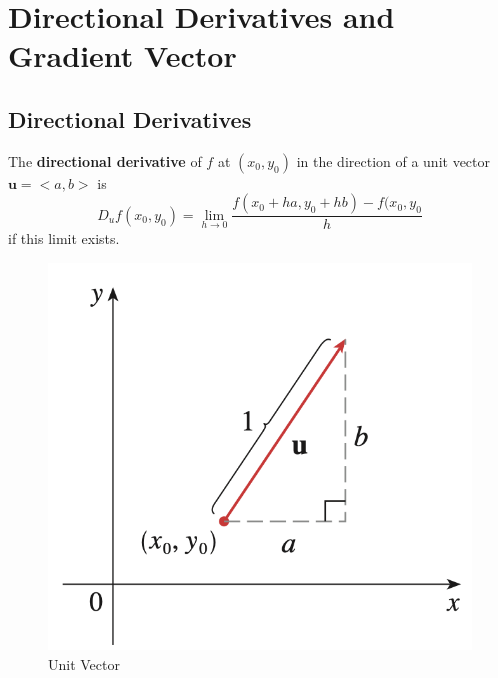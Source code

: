 \chapter{Directional Derivatives and Gradient Vector}

\section{Directional Derivatives}
\begin{definition}
    The \textbf{directional derivative} of $f$ at $(x_0, y_0) $ in the direction of a unit vector $\textbf{u}=<a, b>$ is
    \begin{equation}
        D_uf(x_0, y_0)= \lim_{h \to 0} \frac{f(x_0 + ha, y_0 + hb) - f(x_0, y_0}{h}
    \end{equation}
    if this limit exists.
\end{definition}

\begin{figure}[h]
    \centering
    \includegraphics[scale=0.6]{chapter002/figures/fig002}
    \caption{Unit Vector}
    \label{fig:Unit Vector}
\end{figure}

